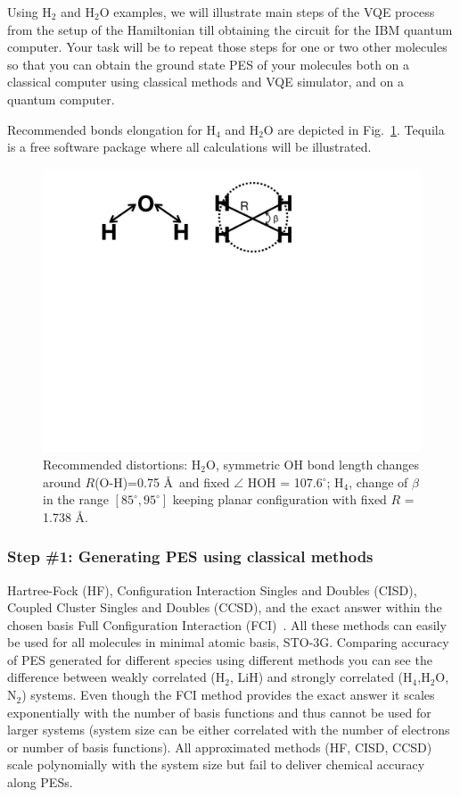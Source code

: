 \documentclass[12pt]{article}
\begin{document}
Using H$_2$ and H$_2$O examples, 
we will illustrate main steps of the VQE process from the setup of the Hamiltonian till obtaining the circuit for the IBM quantum computer. 
Your task will be to repeat those steps for one or two other molecules so that you can obtain the ground state PES of your molecules 
both on a classical computer using classical methods and VQE simulator, and on a quantum computer. 

Recommended bonds elongation for H$_4$ and H$_2$O are depicted in Fig.~\ref{fig:Rch}.   
Tequila is a free software package where all calculations will be illustrated.

\begin{figure}
    \begin{center}
        \includegraphics[width=0.5\linewidth]{Rch.pdf}
    \end{center}
    \caption{Recommended distortions: H$_2$O, symmetric OH bond length changes around $R$(O-H)=0.75 \AA~and fixed 
    $\angle$ HOH = 107.6$^\circ$; H$_4$, change of $\beta$ in the range $[85^\circ,95^\circ]$ keeping planar configuration with fixed $R$ = 1.738 \AA.}
    \label{fig:Rch}
\end{figure}

\subsubsection*{Step \#1: Generating PES using classical methods}

Hartree-Fock (HF), Configuration Interaction Singles and Doubles (CISD), 
Coupled Cluster Singles and Doubles (CCSD), and the exact answer within the chosen basis Full Configuration Interaction (FCI)~\cite{Helgaker}.  
All these methods can easily be used for all molecules in minimal atomic basis, STO-3G. 
Comparing accuracy of PES generated for different species using different methods 
you can see the difference between weakly correlated (H$_2$, LiH) 
and strongly correlated (H$_4$,H$_2$O, N$_2$) systems. Even though the FCI method provides the exact answer it 
scales exponentially with the number of basis functions and thus cannot be used for larger systems (system size can be either correlated 
with the number of electrons or number of basis functions). All approximated methods (HF, CISD, CCSD) scale polynomially with the system 
size but fail to deliver chemical accuracy along PESs.\\
\end{document}
